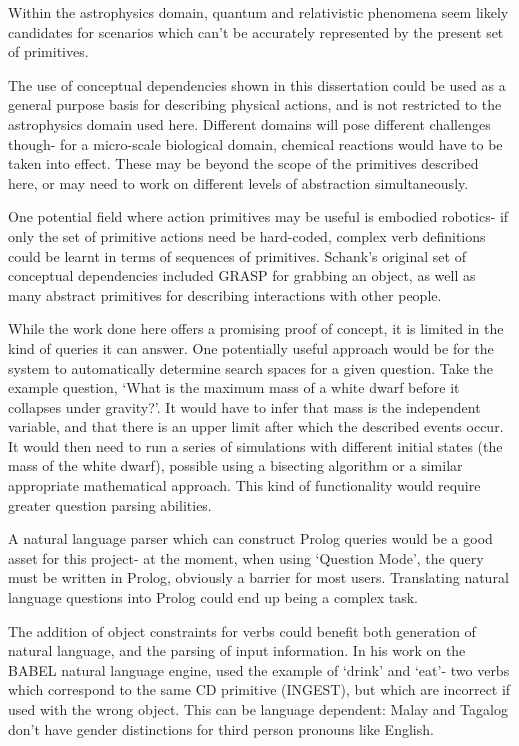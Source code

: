 \documentclass{article}
\begin{document}
    Within the astrophysics domain, quantum and relativistic phenomena seem likely candidates for scenarios which can't be accurately represented by the present set of primitives.

    The use of conceptual dependencies shown in this dissertation could be used as a general purpose basis for describing physical actions, and is not restricted to the astrophysics domain used here. Different domains will pose different challenges though- for a micro-scale biological domain, chemical reactions would have to be taken into effect. These may be beyond the scope of the primitives described here, or may need to work on different levels of abstraction simultaneously.

    One potential field where action primitives may be useful is embodied robotics- if only the set of primitive actions need be hard-coded, complex verb definitions could be learnt in terms of sequences of primitives. Schank's original set of conceptual dependencies included GRASP for grabbing an object, as well as many abstract primitives for describing interactions with other people.

    While the work done here offers a promising proof of concept, it is limited in the kind of queries it can answer. One potentially useful approach would be for the system to automatically determine search spaces for a given question. Take the example question, `What is the maximum mass of a white dwarf before it collapses under gravity?'. It would have to infer that mass is the independent variable, and that there is an upper limit after which the described events occur. It would then need to run a series of simulations with different initial states (the mass of the white dwarf), possible using a bisecting algorithm or a similar appropriate mathematical approach. This kind of functionality would require greater question parsing abilities.

    A natural language parser which can construct Prolog queries would be a good asset for this project- at the moment, when using `Question Mode', the query must be written in Prolog, obviously a barrier for most users. Translating natural language questions into Prolog could end up being a complex task.

    The addition of object constraints for verbs could benefit both generation of natural language, and the parsing of input information. In his work on the BABEL natural language engine, \citeauthor{GOLDMAN1975289} used the example of `drink' and `eat'- two verbs which correspond to the same CD primitive (INGEST), but which are incorrect if used with the wrong object. This can be language dependent: Malay and Tagalog don't have gender distinctions for third person pronouns like English.
\end{document}
